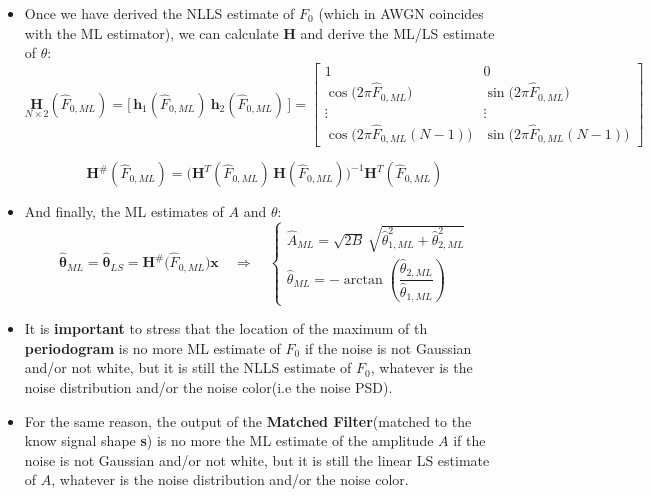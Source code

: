 \begin{itemize}
\item Once we have derived the NLLS estimate of \(F_0\) (which in AWGN coincides with the ML estimator), we can calculate \textbf{H} and derive the ML/LS estimate of \(\theta\):
\[
\underset{N\times 2}{\mathbf{H}}(\hat{F}_{0,ML})
= \big[\,\mathbf{h}_{1}(\hat{F}_{0,ML})\ \mathbf{h}_{2}(\hat{F}_{0,ML})\,\big]
=
\begin{bmatrix}
1 & 0 \\
\cos\!\big(2\pi \hat{F}_{0,ML}\big) & \sin\!\big(2\pi \hat{F}_{0,ML}\big) \\
\vdots & \vdots \\
\cos\!\big(2\pi \hat{F}_{0,ML}(N-1)\big) &
\sin\!\big(2\pi \hat{F}_{0,ML}(N-1)\big)
\end{bmatrix}
\]

\[
\mathbf{H}^{\#}(\hat{F}_{0,ML})
= \big(\mathbf{H}^{T}(\hat{F}_{0,ML})\,\mathbf{H}(\hat{F}_{0,ML})\big)^{-1}
   \mathbf{H}^{T}(\hat{F}_{0,ML})
\]

\item And finally, the ML estimates of \(A\) and \(\theta\):
\[
\hat{\boldsymbol{\theta}}_{ML}
= \hat{\boldsymbol{\theta}}_{LS}
= \mathbf{H}^{\#}\big(\hat{F}_{0,ML}\big)\mathbf{x}
\quad\Longrightarrow\quad
\begin{cases}
\displaystyle
\hat{A}_{ML}
= \sqrt{2B}\,\sqrt{\hat{\theta}_{1,ML}^{2} + \hat{\theta}_{2,ML}^{2}} \\[8pt]
\displaystyle
\hat{\theta}_{ML}
= -\arctan\!\left(\dfrac{\hat{\theta}_{2,ML}}{\hat{\theta}_{1,ML}}\right)
\end{cases}
\]

\item It is \textbf{important} to stress that the location of the maximum of th \textbf{periodogram} is no more ML estimate of \(F_0\) if the noise is not Gaussian and/or not white, but it is still the NLLS estimate of \(F_0\), whatever is the noise distribution and/or the noise color(i.e the noise PSD).
\item For the same reason, the output of the \textbf{Matched Filter}(matched to the know signal shape \textbf{s}) is no more the ML estimate of the amplitude \(A\) if the noise is not Gaussian and/or not white, but it is still the linear LS estimate of \(A\), whatever is the noise distribution and/or the noise color.
\end{itemize}
